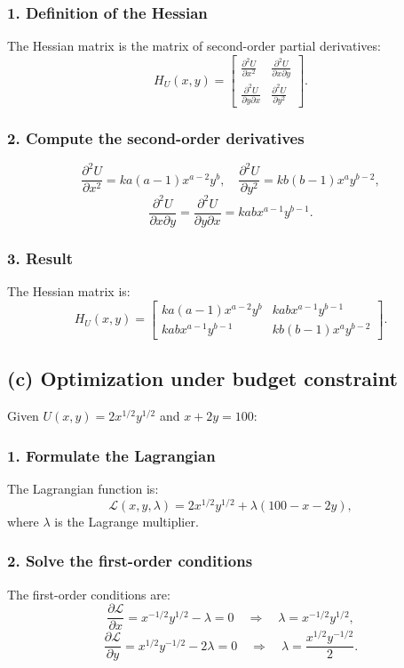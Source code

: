 \documentclass[12pt]{article}
\begin{document}
\subsubsection*{1. Definition of the Hessian}
The Hessian matrix is the matrix of second-order partial derivatives:
\[
H_U(x, y) = \begin{bmatrix}
\frac{\partial^2 U}{\partial x^2} & \frac{\partial^2 U}{\partial x \partial y} \\[8pt]
\frac{\partial^2 U}{\partial y \partial x} & \frac{\partial^2 U}{\partial y^2}
\end{bmatrix}.
\]

\subsubsection*{2. Compute the second-order derivatives}
\[
\frac{\partial^2 U}{\partial x^2} = k a (a-1) x^{a-2} y^b, \quad
\frac{\partial^2 U}{\partial y^2} = k b (b-1) x^a y^{b-2},
\]
\[
\frac{\partial^2 U}{\partial x \partial y} = \frac{\partial^2 U}{\partial y \partial x} = k a b x^{a-1} y^{b-1}.
\]

\subsubsection*{3. Result}
The Hessian matrix is:
\[
H_U(x, y) = \begin{bmatrix}
k a (a-1) x^{a-2} y^b & k a b x^{a-1} y^{b-1} \\[8pt]
k a b x^{a-1} y^{b-1} & k b (b-1) x^a y^{b-2}
\end{bmatrix}.
\]
\newpage
\subsection*{(c) Optimization under budget constraint}

Given \(U(x, y) = 2x^{1/2}y^{1/2}\) and \(x + 2y = 100\):

\subsubsection*{1. Formulate the Lagrangian}
The Lagrangian function is:
\[
\mathcal{L}(x, y, \lambda) = 2x^{1/2}y^{1/2} + \lambda(100 - x - 2y),
\]
where \(\lambda\) is the Lagrange multiplier.

\subsubsection*{2. Solve the first-order conditions}
The first-order conditions are:
\[
\frac{\partial \mathcal{L}}{\partial x} = x^{-1/2}y^{1/2} - \lambda = 0 \quad \Rightarrow \quad \lambda = x^{-1/2}y^{1/2},
\]
\[
\frac{\partial \mathcal{L}}{\partial y} = x^{1/2}y^{-1/2} - 2\lambda = 0 \quad \Rightarrow \quad \lambda = \frac{x^{1/2}y^{-1/2}}{2}.
\]
\end{document}
